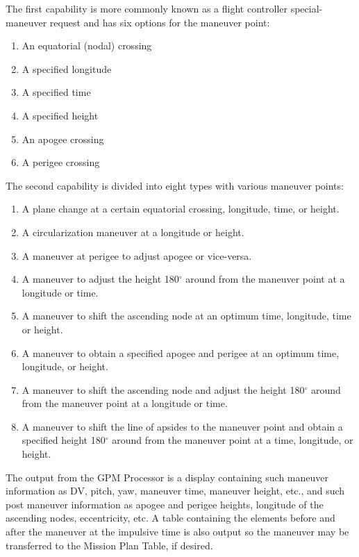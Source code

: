 \documentclass[11pt]{article} %
\begin{document}
The first capability is more commonly known as a flight controller special-maneuver request and has six options for the maneuver point:

\begin{enumerate}
	\item An equatorial (nodal) crossing
	\item A specified longitude
	\item A specified time
	\item A specified height
	\item An apogee crossing
	\item A perigee crossing
\end{enumerate}

The second capability is divided into eight types with various maneuver points:

\begin{enumerate}
	\item A plane change at a certain equatorial crossing, longitude, time, or height.
	\item A circularization maneuver at a longitude or height.
	\item A maneuver at perigee to adjust apogee or vice-versa.
	\item A maneuver to adjust the height 180$^{\circ}$ around from the maneuver point at a longitude or time.
	\item A maneuver to shift the ascending node at an optimum time, longitude, time or height.
	\item A maneuver to obtain a specified apogee and perigee at an optimum time, longitude, or height.
	\item A maneuver to shift the ascending node and adjust the height 180$^{\circ}$ around from the maneuver point at a longitude or time.
\item A maneuver to shift the line of apsides to the maneuver point and obtain a specified height 180$^{\circ}$ around from the maneuver point at a time, longitude, or height.
\end{enumerate}

The output from the GPM Processor is a display containing such maneuver information as DV, pitch, yaw, maneuver time, maneuver height, etc., and such post maneuver information as apogee and perigee heights, longitude of the ascending nodes, eccentricity, etc. A table containing the elements before and after the maneuver at the impulsive time is also output so the maneuver may be transferred to the Mission Plan Table, if desired.\\
\end{document}
